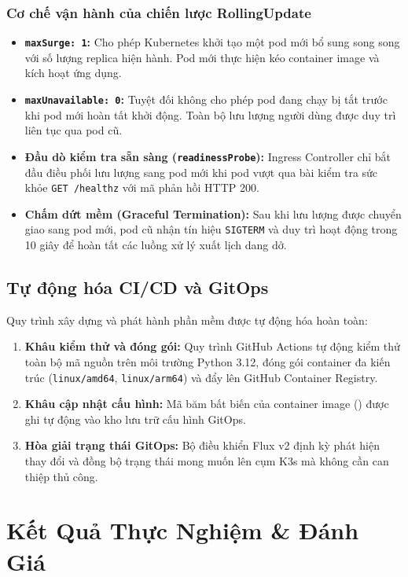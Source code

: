 \documentclass[11pt,a4paper]{article}
\begin{document}
\subsubsection{Cơ chế vận hành của chiến lược RollingUpdate}
\begin{itemize}
    \item \textbf{\texttt{maxSurge: 1}:} Cho phép Kubernetes khởi tạo một pod mới bổ sung song song với số lượng replica hiện hành. Pod mới thực hiện kéo container image và kích hoạt ứng dụng.
    \item \textbf{\texttt{maxUnavailable: 0}:} Tuyệt đối không cho phép pod đang chạy bị tắt trước khi pod mới hoàn tất khởi động. Toàn bộ lưu lượng người dùng được duy trì liên tục qua pod cũ.
    \item \textbf{Đầu dò kiểm tra sẵn sàng (\texttt{readinessProbe}):} Ingress Controller chỉ bắt đầu điều phối lưu lượng sang pod mới khi pod vượt qua bài kiểm tra sức khỏe \texttt{GET /healthz} với mã phản hồi HTTP 200.
    \item \textbf{Chấm dứt mềm (Graceful Termination):} Sau khi lưu lượng được chuyển giao sang pod mới, pod cũ nhận tín hiệu \texttt{SIGTERM} và duy trì hoạt động trong 10 giây để hoàn tất các luồng xử lý xuất lịch dang dở.
\end{itemize}

\subsection{Tự động hóa CI/CD và GitOps}
Quy trình xây dựng và phát hành phần mềm được tự động hóa hoàn toàn:
\begin{enumerate}
    \item \textbf{Khâu kiểm thử và đóng gói:} Quy trình GitHub Actions tự động kiểm thử toàn bộ mã nguồn trên môi trường Python 3.12, đóng gói container đa kiến trúc (\texttt{linux/amd64}, \texttt{linux/arm64}) và đẩy lên GitHub Container Registry.
    \item \textbf{Khâu cập nhật cấu hình:} Mã băm bất biến của container image () được ghi tự động vào kho lưu trữ cấu hình GitOps.
    \item \textbf{Hòa giải trạng thái GitOps:} Bộ điều khiển Flux v2 định kỳ phát hiện thay đổi và đồng bộ trạng thái mong muốn lên cụm K3s mà không cần can thiệp thủ công.
\end{enumerate}

\section{Kết Quả Thực Nghiệm \& Đánh Giá}
\end{document}
